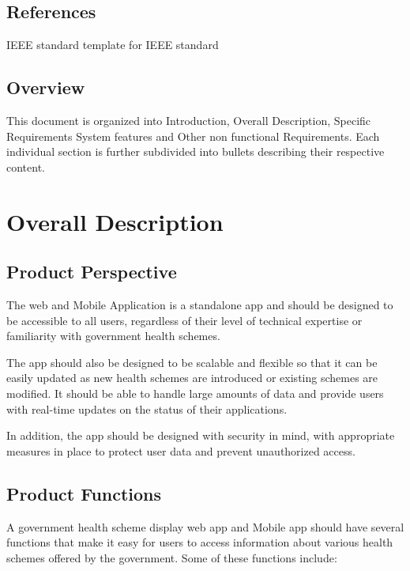\documentclass{article}
\begin{document}
\subsection{References}
IEEE standard template for IEEE standard

\subsection{Overview}
This document is organized into Introduction, Overall Description,
Specific Requirements System features and Other non functional
Requirements. Each individual section is further subdivided into bullets
describing their respective content.

\section{Overall Description}
\subsection{Product Perspective}
The web and Mobile Application is a standalone app and should be
designed to be accessible to all users, regardless of their level of
technical expertise or familiarity with government health schemes.

The app should also be designed to be scalable and flexible so that it
can be easily updated as new health schemes are introduced or existing
schemes are modified. It should be able to handle large amounts of data
and provide users with real-time updates on the status of their
applications.

In addition, the app should be designed with security in mind, with
appropriate measures in place to protect user data and prevent
unauthorized access.

\subsection{Product Functions}
A government health scheme display web app and Mobile app should have
several functions that make it easy for users to access information
about various health schemes offered by the government. Some of these
functions include:
\end{document}
